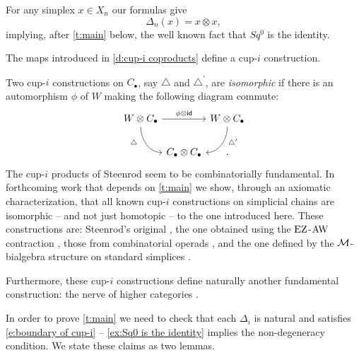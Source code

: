\begin{example} \label{ex:Sq0 is the identity}
	For any simplex $x \in X_n$ our formulas give
	\begin{equation*}
	\Delta_n(x) = x \otimes x,
	\end{equation*}
	implying, after \cref{t:main} below, the well known fact that $Sq^0$ is the identity.
\end{example}

\begin{theorem} \label{t:main}
	The maps introduced in \cref{d:cup-i coproducts} define a cup-$i$ construction.
\end{theorem}

\begin{remark}
	Two \mbox{cup-$i$} constructions on $C_\bullet$, say $\triangle$ and $\triangle^\prime$, are \textit{isomorphic} if there is an automorphism $\phi$ of $W$ making the following diagram commute:
	\[
	\begin{tikzcd} [column sep = 0, row sep=normal]
	W \otimes C_\bullet \arrow[rr, "\phi \otimes \id"] \arrow[rd, in=180, out=-90, "\triangle^{\phantom{\prime}}"', near start] & &
	W \otimes C_\bullet \arrow[ld, in=0, out=-90, "\triangle^\prime", near start] \\
	& C_\bullet \ot C_\bullet & .
	\end{tikzcd}
	\]
	The cup-$i$ products of Steenrod seem to be combinatorially fundamental.
	In forthcoming work \cite{medina2018axiomatic} that depends on \cref{t:main} we show, through an axiomatic characterization, that all known cup-$i$ constructions on simplicial chains are isomorphic -- and not just homotopic -- to the one introduced here.
	These constructions are: Steenrod's original \cite{steenrod1947products}, the one obtained using the $\operatorname{EZ}$-$\operatorname{AW}$ contraction \cite{real1996computability, gonzalez-diaz1999steenrod}, those from combinatorial operads \cite{mcclure2003multivariable, berger2004combinatorial}, and the one defined by the $\mathcal{M}$-bialgebra structure on standard simplices \cite{medina2020prop1, medina2018prop2}.

	Furthermore, these cup-$i$ constructions define naturally another fundamental construction: the nerve of higher categories \cite{street1987orientals, medina2020globular}.
\end{remark}


In order to prove \cref{t:main} we need to check that each $\Delta_i$ is natural and satisfies \eqref{e:boundary of cup-i} -- \cref{ex:Sq0 is the identity} implies the non-degeneracy condition.
We state these claims as two lemmas.

